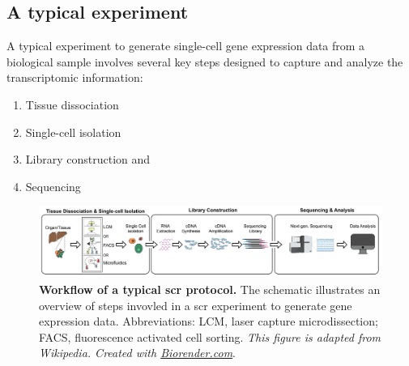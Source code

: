 
\subsection{A typical  experiment}
\label{sec:scrna_typical}
\par A typical experiment to generate single-cell gene expression data from a biological sample involves several key steps designed to capture and analyze the transcriptomic information: 
\begin{enumerate}
\item Tissue dissociation
\item Single-cell isolation
\item Library construction and 
\item Sequencing 
\end{enumerate}

\begin{figure}[b]
    \centering
    \includegraphics[width=\linewidth]{Chapter1/Fig/F1-5-01.png}
    \caption[A typical single-cell RNA-sequencing experiment]{\textbf{Workflow of a typical \gls{scr} protocol.} The schematic illustrates an overview of steps invovled in a \gls{scr} experiment to generate gene expression data. Abbreviations: LCM, laser capture microdissection; FACS, fluorescence activated cell sorting. \textit{This figure is adapted from Wikipedia. Created with \href{https://www.biorender.com/}{Biorender.com}}.}
    \label{fig:chp1_scrna-2}
\end{figure}

